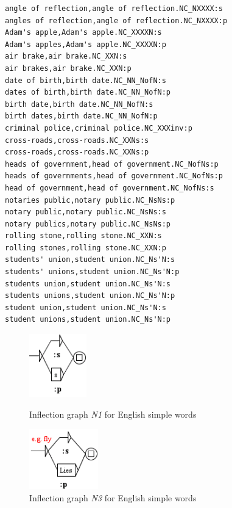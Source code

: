 \begin{verbatim}
angle of reflection,angle of reflection.NC_NXXXX:s
angles of reflection,angle of reflection.NC_NXXXX:p
Adam's apple,Adam's apple.NC_XXXXN:s
Adam's apples,Adam's apple.NC_XXXXN:p
air brake,air brake.NC_XXN:s
air brakes,air brake.NC_XXN:p
date of birth,birth date.NC_NN_NofN:s
dates of birth,birth date.NC_NN_NofN:p
birth date,birth date.NC_NN_NofN:s
birth dates,birth date.NC_NN_NofN:p
criminal police,criminal police.NC_XXXinv:p
cross-roads,cross-roads.NC_XXNs:s
cross-roads,cross-roads.NC_XXNs:p
heads of government,head of government.NC_NofNs:p
heads of governments,head of government.NC_NofNs:p
head of government,head of government.NC_NofNs:s
notaries public,notary public.NC_NsNs:p
notary public,notary public.NC_NsNs:s
notary publics,notary public.NC_NsNs:p
rolling stone,rolling stone.NC_XXN:s
rolling stones,rolling stone.NC_XXN:p
students' union,student union.NC_Ns'N:s
students' unions,student union.NC_Ns'N:p
students union,student union.NC_Ns'N:s
students unions,student union.NC_Ns'N:p
student union,student union.NC_Ns'N:s
student unions,student union.NC_Ns'N:p
\end{verbatim}
 
\begin{figure}[ht]
\begin{minipage}[c]{0.45\textwidth}
 \centering
 \includegraphics[width=2.5cm]{resources/img/N1'EN.png}
  \caption{Inflection graph \emph{N1} for English simple words}
  \label{fig:N1'EN}
\end{minipage}\hfill
\begin{minipage}[c]{0.5\textwidth}
 \centering
 \includegraphics[width=3cm]{resources/img/N3'EN.png}
  \caption{Inflection graph \emph{N3} for English simple words}
  \label{fig:N3'EN}
\end{minipage}
\end{figure}


